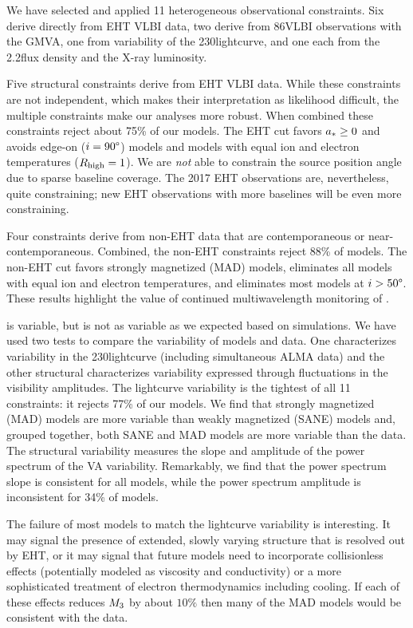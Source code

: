 We have selected and applied 11 heterogeneous observational constraints.
Six derive directly from EHT VLBI data, two derive from 86\GHz VLBI observations with the GMVA, one from variability of the 230\GHz lightcurve, and one each from the 2.2\um flux density and the X-ray luminosity.

Five structural constraints derive from EHT VLBI data.
While these constraints are not independent, which makes their interpretation as likelihood difficult, the multiple constraints make our analyses more robust.
When combined these constraints reject about 75\% of our \fiducial models.
The EHT cut favors $a_* \ge 0$ and avoids edge-on ($i = 90\degree$) models and models with equal ion and electron temperatures ($R_\mathrm{high} = 1$).
We are {\em not} able to constrain the source position angle due to sparse baseline coverage.
The 2017 EHT observations are, nevertheless, quite constraining; new EHT observations with more baselines will be even more constraining.

Four constraints derive from non-EHT data that are contemporaneous or near-contemporaneous.
Combined, the non-EHT constraints reject 88\% of \fiducial models.
The non-EHT cut favors strongly magnetized (MAD) models, eliminates all models with equal ion and electron temperatures, and eliminates most models at $i > 50\degree$.
These results highlight the value of continued multiwavelength monitoring of \sgra.

\sgra is variable, but is not as variable as we expected based on simulations.
We have used two tests to compare the variability of models and data.
One characterizes variability in the 230\GHz lightcurve (including simultaneous ALMA data) and the other structural characterizes variability expressed through fluctuations in the visibility amplitudes.
The lightcurve variability is the tightest of all 11 constraints: it rejects 77\% of our \fiducial models.
We find that strongly magnetized (MAD) models are more variable than weakly magnetized (SANE) models and, grouped together, both SANE and MAD models are more variable than the data.
The structural variability measures the slope and amplitude of the power spectrum of the VA variability.
Remarkably, we find that the power spectrum slope is consistent for all models, while the power spectrum amplitude is inconsistent for 34\% of \fiducial models.

The failure of most \fiducial models to match the lightcurve variability is interesting.
It may signal the presence of extended, slowly varying structure that is resolved out by EHT, or it may signal that future models need to incorporate collisionless effects (potentially modeled as viscosity and conductivity) or a more sophisticated treatment of electron thermodynamics including cooling.
If each of these effects reduces $M_{3}$ by about $10\%$ then many of the MAD models would be consistent with the data.

